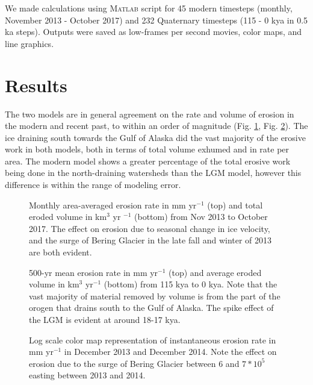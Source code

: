 \documentclass[twocolumn]{aastex6}
\begin{document}
		We made calculations using \textsc{Matlab} script for 45 modern timesteps (monthly, November 2013 - October 2017) and 232 Quaternary timesteps (115 - 0 kya in 0.5 ka steps). Outputs were saved as low-frames per second movies, color maps, and line graphics.

	\section{Results}
		
		The two models are in general agreement on the rate and volume of erosion in the modern and recent past, to within an order of magnitude (Fig. \ref{f:erosmod}, Fig. \ref{f:eroslgm}). The ice draining south towards the Gulf of Alaska did the vast majority of the erosive work in both models, both in terms of total volume exhumed and in rate per area. The modern model shows a greater percentage of the total erosive work being done in the north-draining watersheds than the LGM model, however this difference is within the range of modeling error. 
		
		\begin{figure}[t]
			\centering
			\caption{\label{f:erosmod} Monthly area-averaged erosion rate in mm yr$^{-1}$ (top) and total eroded volume in km$^3$ yr $^{-1}$ (bottom) from Nov 2013 to October 2017. The effect on erosion due to seasonal change in ice velocity, and the surge of Bering Glacier in the late fall and winter of 2013 are both evident.}
		\end{figure}
		
		\begin{figure}[t]
			\centering
			\caption{\label{f:eroslgm} 500-yr mean erosion rate in mm yr$^{-1}$ (top) and average eroded volume in km$^3$ yr$^{-1}$ (bottom) from 115 kya to 0 kya. Note that the vast majority of material removed by volume is from the part of the orogen that drains south to the Gulf of Alaska. The spike effect of the LGM is evident at around 18-17 kya.}
		\end{figure}
		
		\begin{figure}[t]
			\caption{\label{f:eros1314} Log scale color map representation of instantaneous erosion rate in mm yr$^{-1}$ in December 2013 and December 2014. Note the effect on erosion due to the surge of Bering Glacier between 6 and $7 * 10^5$ easting between 2013 and 2014.}
		\end{figure}
		
\end{document}
